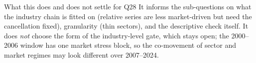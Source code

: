 \begin{openbox}{What this does and does not settle for Q28}
It informs the sub-questions on what the industry chain is fitted on (relative series are less market-driven but
need the cancellation fixed), granularity (thin sectors), and the descriptive check itself. It does \emph{not} choose
the form of the industry-level gate, which stays open; the 2000--2006 window has one market stress block, so the
co-movement of sector and market regimes may look different over 2007--2024.
\end{openbox}
